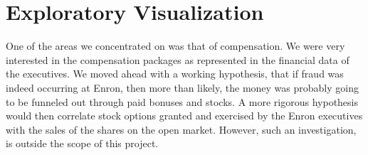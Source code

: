 \documentclass[twoside,openright,titlepage,numbers=noenddot,headinclude,%
               footinclude=true,cleardoublepage=empty,abstractoff,BCOR=5mm,%
               paper=a4,fontsize=11pt,ngerman,american]{scrreprt}
\numberwithin{theorem}{chapter}
\numberwithin{definition}{chapter}
\numberwithin{algorithm}{chapter}
\numberwithin{figure}{chapter}
\numberwithin{table}{chapter}
\numberwithin{equation}{chapter}
\begin{document}
\section*{Exploratory Visualization}

One of the areas we concentrated on was that of compensation. We were very interested in the compensation packages as represented in the financial data of the executives. We moved ahead with a working hypothesis, that if fraud was indeed occurring at Enron, then more than likely, the money was probably going to be funneled out through paid bonuses and stocks. A more rigorous hypothesis would then correlate stock options granted and exercised by the Enron executives with the sales of the shares on the open market. However, such an investigation, is outside the scope of this project. 
\end{document}
